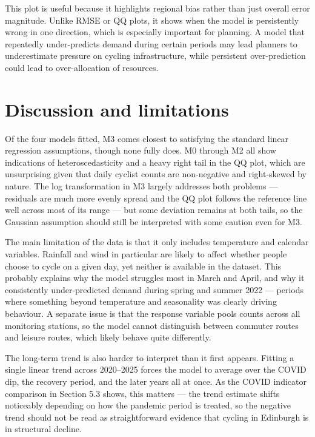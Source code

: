 \documentclass[
]{article}
\newcounter{none} %
\begin{document}
This plot is useful because it highlights regional bias rather than just overall error magnitude. Unlike RMSE or QQ plots, it shows when the model is persistently wrong in one direction, which is especially important for planning. A model that repeatedly under-predicts demand during certain periods may lead planners to underestimate pressure on cycling infrastructure, while persistent over-prediction could lead to over-allocation of resources.

\section{Discussion and limitations}\label{discussion-and-limitations}

Of the four models fitted, M3 comes closest to satisfying the standard linear regression assumptions, though none fully does. M0 through M2 all show indications of heteroscedasticity and a heavy right tail in the QQ plot, which are unsurprising given that daily cyclist counts are non-negative and right-skewed
by nature. The log transformation in M3 largely addresses both problems --- residuals are much more evenly spread and the QQ plot follows the reference line well across most of its range --- but some deviation remains at both tails, so the Gaussian assumption should still be interpreted with some caution even for M3.

The main limitation of the data is that it only includes temperature and calendar variables. Rainfall and wind in particular are likely to affect whether people choose to cycle on a given day, yet neither is available in the dataset. This probably explains why the model struggles most in March and April, and why it consistently under-predicted demand during spring and summer 2022 --- periods where something beyond temperature and seasonality was clearly
driving behaviour. A separate issue is that the response variable pools counts across all monitoring stations, so the model cannot distinguish between commuter routes and leisure routes, which likely behave quite differently.

The long-term trend is also harder to interpret than it first appears. Fitting a single linear trend across 2020--2025 forces the model to average over the COVID dip, the recovery period, and the later years all at once. As the COVID indicator comparison in Section 5.3 shows, this matters --- the trend estimate shifts noticeably depending on how the pandemic period is treated, so the negative trend should not be read as straightforward evidence that cycling in Edinburgh is in structural decline.
\end{document}
